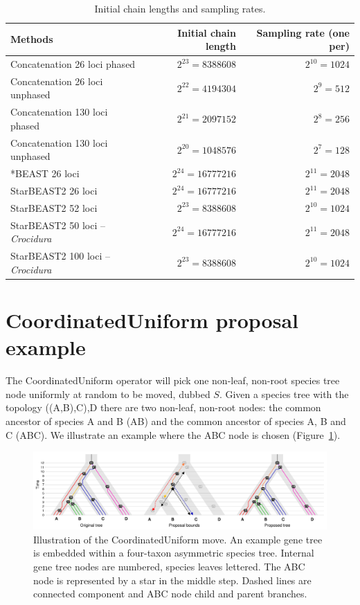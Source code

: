 \documentclass[12pt]{article}
\begin{document}
\begin{table}[htb!]
\centering
\caption{Initial chain lengths and sampling rates.}
\label{tab:chainLengths}
\begin{threeparttable}
\begin{adjustbox}{center}
\begin{tabular}{|l|r|r|}
\hline
Methods & Initial chain length & Sampling rate (one per)\tabularnewline
\hline
Concatenation 26 loci phased & $2^{23} = 8388608$ & $2^{10} = 1024$\tabularnewline
\hline
Concatenation 26 loci unphased & $2^{22} = 4194304$ & $2^{9} = 512$\tabularnewline
\hline
Concatenation 130 loci phased & $2^{21} = 2097152$ & $2^{8} = 256$\tabularnewline
\hline
Concatenation 130 loci unphased & $2^{20} = 1048576$ & $2^{7} = 128$\tabularnewline
\hline
*BEAST 26 loci & $2^{24} = 16777216$ & $2^{11} = 2048$\tabularnewline
\hline
StarBEAST2 26 loci & $2^{24} = 16777216$ & $2^{11} = 2048$\tabularnewline
\hline
StarBEAST2 52 loci & $2^{23} = 8388608$ & $2^{10} = 1024$\tabularnewline
\hline
StarBEAST2 50 loci -- \textit{Crocidura} & $2^{24} = 16777216$ & $2^{11} = 2048$\tabularnewline
\hline
StarBEAST2 100 loci -- \textit{Crocidura} & $2^{23} = 8388608$ & $2^{10} = 1024$\tabularnewline
\hline
\end{tabular}
\end{adjustbox}
\end{threeparttable}
\end{table}

\clearpage

\section{CoordinatedUniform proposal example}

The CoordinatedUniform operator will pick one non-leaf, non-root species tree
node uniformly at random to be moved, dubbed $S$. Given a species tree with
the topology ((A,B),C),D there are two non-leaf, non-root nodes: the common
ancestor of species A and B (AB) and the common ancestor of species A, B and C
(ABC). We illustrate an example where the ABC node is chosen
(Figure~\ref{fig:coordinatedUniform}).

\begin{figure}[htb!]
\centering
\includegraphics[width=\textwidth]{coordinated_uniform.pdf}
\caption
{Illustration of the CoordinatedUniform move. An example gene tree is embedded
within a four-taxon asymmetric species tree. Internal gene tree nodes
are numbered, species leaves lettered. The ABC node is represented by a star
in the middle step. Dashed lines are connected component and ABC
node child and parent branches.}
\label{fig:coordinatedUniform}
\end{figure}
\end{document}
